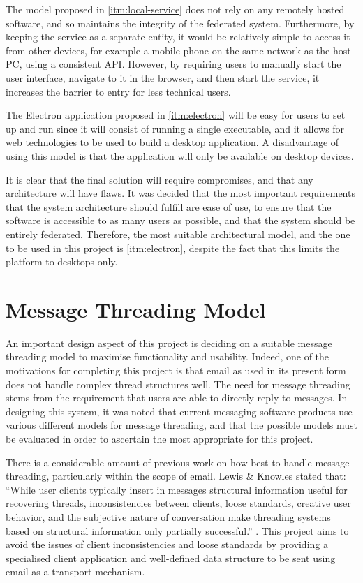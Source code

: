 The model proposed in \ref{itm:local-service} does not rely on any remotely hosted software, and so maintains the integrity of the federated system. Furthermore, by keeping the service as a separate entity, it would be relatively simple to access it from other devices, for example a mobile phone on the same network as the host PC, using a consistent API. However, by requiring users to manually start the user interface, navigate to it in the browser, and then start the service, it increases the barrier to entry for less technical users.

The Electron application proposed in \ref{itm:electron} will be easy for users to set up and run since it will consist of running a single executable, and it allows for web technologies to be used to build a desktop application. A disadvantage of using this model is that the application will only be available on desktop devices.

It is clear that the final solution will require compromises, and that any architecture will have flaws. It was decided that the most important requirements that the system architecture should fulfill are ease of use, to ensure that the software is accessible to as many users as possible, and that the system should be entirely federated. Therefore, the most suitable architectural model, and the one to be used in this project is \ref{itm:electron}, despite the fact that this limits the platform to desktops only.

\section{Message Threading Model}
An important design aspect of this project is deciding on a suitable message threading model to maximise functionality and usability. Indeed, one of the motivations for completing this project is that email as used in its present form does not handle complex thread structures well. The need for message threading stems from the requirement that users are able to directly reply to messages. In designing this system, it was noted that current messaging software products use various different models for message threading, and that the possible models must be evaluated in order to ascertain the most appropriate for this project.

There is a considerable amount of previous work on how best to handle message threading, particularly within the scope of email. Lewis \& Knowles stated that: ``While user clients typically insert in messages structural information useful for recovering threads, inconsistencies between clients, loose standards, creative user behavior, and the subjective nature of conversation make threading systems based on structural information only partially successful.'' \cite{lewis1997threading}. This project aims to avoid the issues of client inconsistencies and loose standards by providing a specialised client application and well-defined data structure to be sent using email as a transport mechanism.

